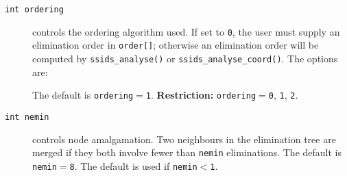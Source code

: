 \begin{description}

\item[\texttt{int ordering}] controls the ordering algorithm used. 
If set to {\tt 0}, the user
must supply an elimination order in {\tt order[]}; otherwise
an elimination order will be computed by {\tt ssids\_analyse()}
or {\tt ssids\_analyse\_coord()}.
The options are:
The default is {\tt ordering}$=${\tt 1}.
{\bf Restriction:} {\tt ordering}$=${\tt 0}, {\tt 1}, {\tt 2}.

\item[\texttt{int nemin}] controls
node amalgamation. Two neighbours in the elimination tree are merged
if they both involve fewer than {\tt nemin} eliminations.
The default is {\tt nemin$=$8}.
The default is used if {\tt nemin$<$1}.
\end{description}

